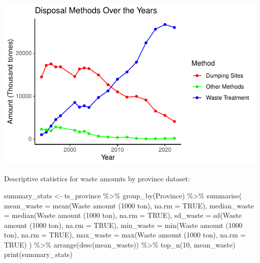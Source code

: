 \documentclass[
  11pt,
  a4paper,
  DIV=11,
  numbers=noendperiod]{scrartcl}
\newenvironment{Shaded}{\begin{snugshade}}{\end{snugshade}}
\newcommand{\AttributeTok}[1]{\textcolor[rgb]{0.40,0.45,0.13}{#1}}
\newcommand{\ConstantTok}[1]{\textcolor[rgb]{0.56,0.35,0.01}{#1}}
\newcommand{\DecValTok}[1]{\textcolor[rgb]{0.68,0.00,0.00}{#1}}
\newcommand{\FunctionTok}[1]{\textcolor[rgb]{0.28,0.35,0.67}{#1}}
\newcommand{\NormalTok}[1]{\textcolor[rgb]{0.00,0.23,0.31}{#1}}
\newcommand{\OtherTok}[1]{\textcolor[rgb]{0.00,0.23,0.31}{#1}}
\newcommand{\SpecialCharTok}[1]{\textcolor[rgb]{0.37,0.37,0.37}{#1}}
\newcommand{\StringTok}[1]{\textcolor[rgb]{0.13,0.47,0.30}{#1}}
\begin{document}
\includegraphics{project_files/figure-pdf/unnamed-chunk-23-1.pdf}

Descriptive statistics for waste amounts by province dataset:

\begin{Shaded}
\begin{Highlighting}[]
\NormalTok{summary\_stats }\OtherTok{\textless{}{-}}\NormalTok{ ts\_province }\SpecialCharTok{\%\textgreater{}\%}
  \FunctionTok{group\_by}\NormalTok{(Province) }\SpecialCharTok{\%\textgreater{}\%}
  \FunctionTok{summarise}\NormalTok{(}
    \AttributeTok{mean\_waste =} \FunctionTok{mean}\NormalTok{(}\StringTok{\textasciigrave{}}\AttributeTok{Waste amount (1000 ton)}\StringTok{\textasciigrave{}}\NormalTok{, }\AttributeTok{na.rm =} \ConstantTok{TRUE}\NormalTok{),}
    \AttributeTok{median\_waste =} \FunctionTok{median}\NormalTok{(}\StringTok{\textasciigrave{}}\AttributeTok{Waste amount (1000 ton)}\StringTok{\textasciigrave{}}\NormalTok{, }\AttributeTok{na.rm =} \ConstantTok{TRUE}\NormalTok{),}
    \AttributeTok{sd\_waste =} \FunctionTok{sd}\NormalTok{(}\StringTok{\textasciigrave{}}\AttributeTok{Waste amount (1000 ton)}\StringTok{\textasciigrave{}}\NormalTok{, }\AttributeTok{na.rm =} \ConstantTok{TRUE}\NormalTok{),}
    \AttributeTok{min\_waste =} \FunctionTok{min}\NormalTok{(}\StringTok{\textasciigrave{}}\AttributeTok{Waste amount (1000 ton)}\StringTok{\textasciigrave{}}\NormalTok{, }\AttributeTok{na.rm =} \ConstantTok{TRUE}\NormalTok{),}
    \AttributeTok{max\_waste =} \FunctionTok{max}\NormalTok{(}\StringTok{\textasciigrave{}}\AttributeTok{Waste amount (1000 ton)}\StringTok{\textasciigrave{}}\NormalTok{, }\AttributeTok{na.rm =} \ConstantTok{TRUE}\NormalTok{)}
\NormalTok{  ) }\SpecialCharTok{\%\textgreater{}\%}
  \FunctionTok{arrange}\NormalTok{(}\FunctionTok{desc}\NormalTok{(mean\_waste)) }\SpecialCharTok{\%\textgreater{}\%}
  \FunctionTok{top\_n}\NormalTok{(}\DecValTok{10}\NormalTok{, mean\_waste)}
\FunctionTok{print}\NormalTok{(summary\_stats)}
\end{Highlighting}
\end{Shaded}
\end{document}
